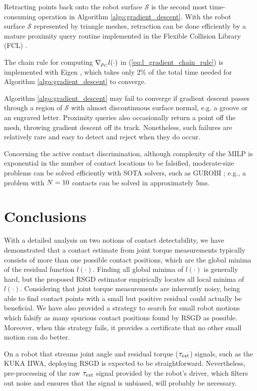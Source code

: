 Retracting points back onto the robot surface $\mathcal{S}$ is the second most time-consuming operation in Algorithm \ref{algo:gradient_descent}. With the robot surface $\mathcal{S}$ represented by triangle meshes, retraction can be done efficiently by a mature proximity query routine implemented in the Flexible Collision Library (FCL) \cite{pan2012fcl}. 

The chain rule for computing $\nabla_{\bar{p}_C} l(\cdot)$ in (\ref{eq:l_gradient_chain_rule}) is implemented with Eigen \cite{eigenweb}, which takes only 2\% of the total time needed for Algorithm \ref{algo:gradient_descent} to converge.

Algorithm \ref{algo:gradient_descent} may fail to converge if gradient descent passes through a region of $\mathcal{S}$ with almost discontinuous surface normal, e.g. a groove or an engraved letter. Proximity queries also occasionally return a point off the mesh, throwing gradient descent off its track. Nonetheless, such failures are relatively rare and easy to detect and reject when they do occur.

Concerning the active contact discrimination, although complexity of the MILP is exponential in the number of contact locations to be falsified, moderate-size problems can be solved efficiently with SOTA solvers, such as GUROBI \cite{gurobi}; e.g., a problem with $N=10$ contacts can be solved in approximately 5ms.


\section{Conclusions}
With a detailed analysis on two notions of contact detectability, we have demonstrated that a contact estimate from joint torque measurements typically consists of more than one possible contact positions, which are the global minima of the residual function $l(\cdot)$. 
Finding all global minima of $l(\cdot)$ is generally hard, but the proposed RSGD estimator empirically locates all local minima of $l(\cdot)$. 
Considering that joint torque measurements are inherently noisy, being able to find contact points with a small but positive residual could actually be beneficial. 
We have also provided a strategy to search for small robot motions which falsify as many spurious contact positions found by RSGD as possible. Moreover, when this strategy fails, it provides a certificate that no other small motion can do better.

On a robot that streams joint angle and residual torque ($\tau_{\text{ext}}$) signals, such as the KUKA IIWA, deploying RSGD is expected to be straightforward. Nevertheless, pre-processing of the raw $\tau_{\text{ext}}$ signal provided by the robot's driver, which filters out noise and ensures that the signal is unbiased, will probably be necessary.
